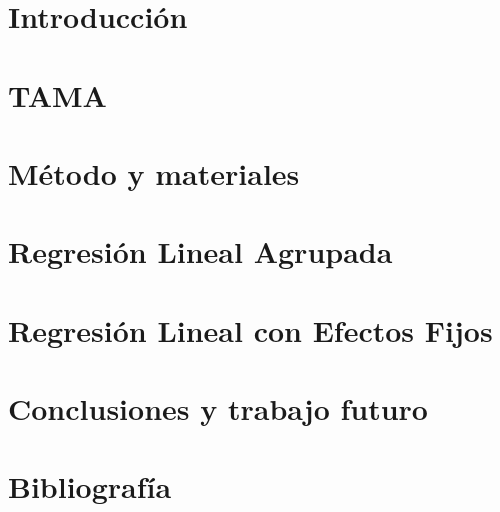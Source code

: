 \documentclass[11pt,a4paper,twoside]{tesis}
\begin{document}
\def\titulo{Licenciado }

\def\autor{Juan Manuel Pérez}
\def\tituloTesis{Mimetización entre interlocutores}
\def\runtitulo{Medición de la mimetización entre interlocutores utilizando series de tiempo}
\def\runtitle{Measuring entrainment between speakers using time series}
\def\director{Agustín Gravano}
\def\codirector{Ramiro Gálvez}
\def\lugar{Buenos Aires, 2015}


\frontmatter
\pagestyle{empty}



\tableofcontents

\mainmatter
\pagestyle{headings}



\chapter{Introducción}



\chapter{TAMA}




\chapter{Método y materiales}



%



\chapter{Regresión Lineal Agrupada}


\chapter{Regresión Lineal con Efectos Fijos}


\chapter{Conclusiones y trabajo futuro}

\chapter{Bibliografía}
\backmatter


\end{document}
